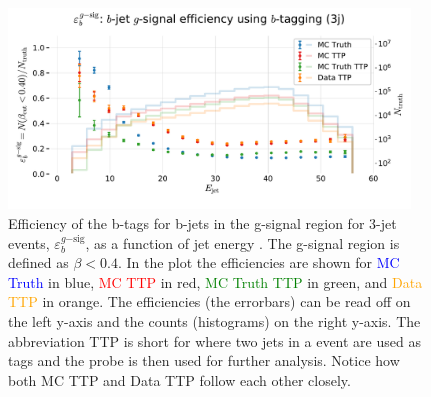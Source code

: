 \begin{figure}
  \includegraphics[width=0.95\textwidth, trim=0 0 0 40, clip]{figures/quarks/eff_b_gsig-down_sample=1.00-ML_vars=vertex-selection=b-ejet_min=4-n_iter_RS_lgb=99-n_iter_RS_xgb=9-cdot_cut=0.90-version=19.pdf}
  \caption[b-Tagging Efficiency $\varepsilon_b^{g\mathrm{-sig}}$ as a function of jet energy]
          {Efficiency of the b-tags for b-jets in the g-signal region for 3-jet events, $\varepsilon_b^{g\mathrm{-sig}}$, as a function of jet energy . The g-signal region is defined as $\beta < 0.4$. In the plot the efficiencies are shown for \textcolor{blue}{MC Truth} in blue, \textcolor{red}{MC TTP} in red, \textcolor{green}{MC Truth TTP} in green, and \textcolor{orange}{Data TTP} in orange. The efficiencies (the errorbars) can be read off on the left y-axis and the counts (histograms) on the right y-axis. The abbreviation TTP is short for  where two jets in a event are used as tags and the probe is then used for further analysis. Notice how both MC TTP and Data TTP follow each other closely.  
          } 
  \label{fig:q:effiency_btag_bjet_gsig}
\end{figure}


